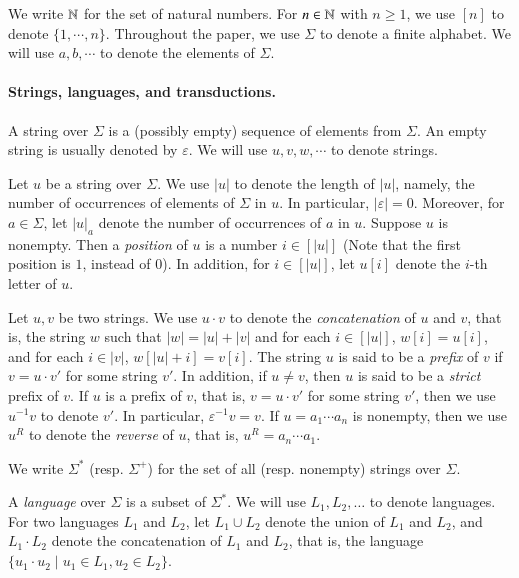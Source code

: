 
We write $\mathbb{N}$ for the set of natural numbers. For $n \in \mathbb{N}$ with $n \ge 1$, we use $[n]$ to denote $\{1, \cdots, n\}$. Throughout the paper, we use $\Sigma$ to denote a  finite alphabet. We will use $a,b,\cdots$ to denote the elements of $\Sigma$.

\paragraph*{Strings, languages, and transductions.}
A string over $\Sigma$ is a (possibly empty) sequence of elements from $\Sigma$. An empty string is usually denoted by $\varepsilon$. We will use $u, v, w, \cdots$ to denote strings. 

Let $u$ be a string over $\Sigma$. We use $|u|$ to denote the length of $|u|$, namely, the number of occurrences of elements of $\Sigma$ in $u$. In particular, $|\varepsilon|=0$. Moreover, for $a \in \Sigma$, let $|u|_a$ denote the number of occurrences of $a$ in $u$. Suppose $u$ is nonempty. Then a \emph{position} of $u$ is a number $i \in [|u|]$ (Note that the first position is $1$, instead of  0). In addition, for $i \in [|u|]$, let $u[i]$ denote the $i$-th letter of $u$. 

Let $u, v$ be two strings. We use $u \cdot v$ to denote the \emph{concatenation} of $u$ and $v$, that is, the string $w$ such that $|w|= |u| + |v|$ and for each $i \in [|u|]$, $w[i]= u[i]$, and for each $i \in |v|$, $w[|u|+i]=v[i]$. The string $u$ is said to be a \emph{prefix} of $v$ if $v = u \cdot v'$ for some string $v'$.
In addition, if $u \neq v$, then $u$ is said to be a \emph{strict} prefix of $v$. If $u$ is a prefix of $v$, that is, $v = u \cdot v'$ for some string $v'$, then 
we use $u^{-1} v$ to denote $v'$. In particular, $\varepsilon^{-1} v = v$.
If $u=a_1 \cdots a_n$ is nonempty, then we use $u^R$ to denote the \emph{reverse} of $u$, that is, $u^R= a_n \cdots a_1$.

We write $\Sigma^*$ (resp. $\Sigma^+$) for the set of all (resp. nonempty) strings over $\Sigma$. 

A \emph{language} over $\Sigma$ is a subset of $\Sigma^*$.  
We will use $L_1, L_2, \dots$ to denote languages. For two languages $L_1$ and $L_2$, let $L_1 \cup L_2$ denote the union of $L_1$ and $L_2$, and $L_1 \cdot L_2$ denote the concatenation of $L_1$ and $L_2$, that is, the language $\{u_1 \cdot u_2 \mid u_1 \in L_1, u_2 \in L_2\}$. 

